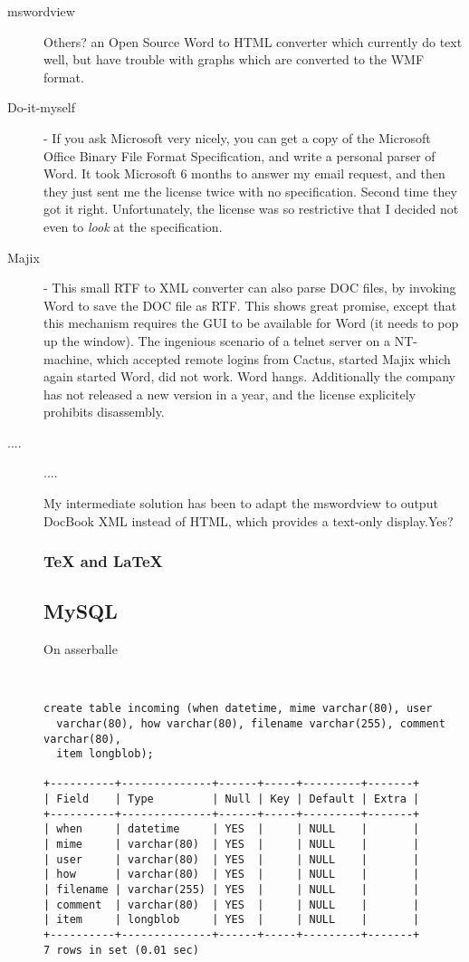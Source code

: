 \begin{description}
  
\item[mswordview] \textsf{Others?} an Open Source Word to HTML
  converter which currently do text well, but have trouble with graphs
  which are converted to the WMF format.
\item[Do-it-myself] - If you ask Microsoft very nicely, you can get a
  copy of the Microsoft Office Binary File Format Specification, and
  write a personal parser of Word.  It took Microsoft 6 months to
  answer my email request, and then they just sent me the license
  twice with no specification.  Second time they got it right.
  Unfortunately, the license was so restrictive that I decided not
  even to \textit{look} at the specification.
\item[Majix] - This small RTF to XML converter can also parse DOC
  files, by invoking Word to save the DOC file as RTF.  This shows
  great promise, except that this mechanism requires the GUI to be
  available for Word (it needs to pop up the window).  The ingenious
  scenario of a telnet server on a NT-machine, which accepted remote
  logins from Cactus, started Majix which again started Word, did not
  work.  Word hangs.   Additionally the company has not released a new
  version in a year, and the license explicitely prohibits
  disassembly.
\item[....]....

My intermediate solution has been to adapt the mswordview to output
DocBook XML instead of HTML, which provides a text-only
display.\textsf{Yes?}


\subsubsection{{\TeX} and {\LaTeX}}




\subsection{MySQL}
On asserballe

\begin{verbatim}


create table incoming (when datetime, mime varchar(80), user
  varchar(80), how varchar(80), filename varchar(255), comment varchar(80),
  item longblob);

+----------+--------------+------+-----+---------+-------+
| Field    | Type         | Null | Key | Default | Extra |
+----------+--------------+------+-----+---------+-------+
| when     | datetime     | YES  |     | NULL    |       |
| mime     | varchar(80)  | YES  |     | NULL    |       |
| user     | varchar(80)  | YES  |     | NULL    |       |
| how      | varchar(80)  | YES  |     | NULL    |       |
| filename | varchar(255) | YES  |     | NULL    |       |
| comment  | varchar(80)  | YES  |     | NULL    |       |
| item     | longblob     | YES  |     | NULL    |       |
+----------+--------------+------+-----+---------+-------+
7 rows in set (0.01 sec)


\end{verbatim}




\end{description}


